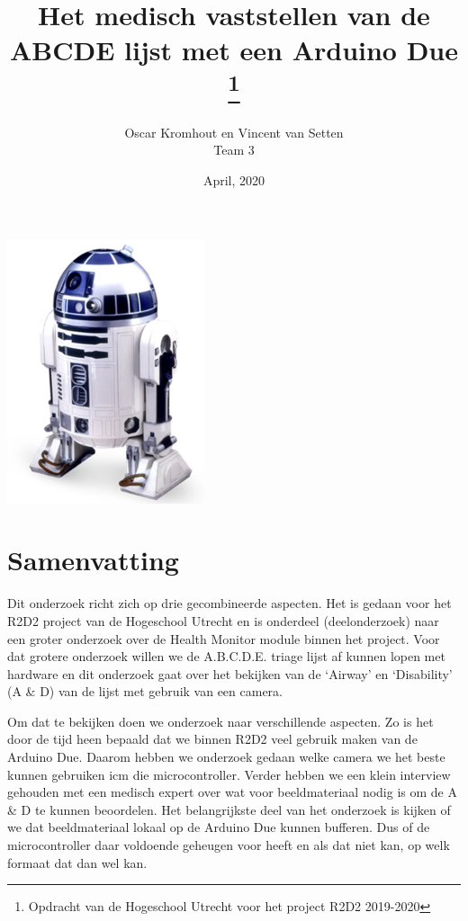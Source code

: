 \documentclass{article}
\title{Het medisch vaststellen van de ABCDE lijst met een Arduino Due \thanks{Opdracht van de Hogeschool Utrecht voor het project R2D2 2019-2020}}
\author{Oscar Kromhout en Vincent van Setten\\ Team 3}
\date{April, 2020}
\begin{document}
\begin{titlepage}
	\centering
	\maketitle
	\includegraphics[scale=2.0]{title.png}
	\clearpage
\end{titlepage}

\tableofcontents
\clearpage
\section{Samenvatting}
Dit onderzoek richt zich op drie gecombineerde aspecten. Het is gedaan voor het R2D2 project van de Hogeschool Utrecht en is onderdeel (deelonderzoek) naar een groter onderzoek over de Health Monitor module binnen het project. Voor dat grotere onderzoek willen we de A.B.C.D.E. triage lijst af kunnen lopen met hardware en dit onderzoek gaat over het bekijken van de ‘Airway’ en ‘Disability’ (A \& D) van de lijst met gebruik van een camera. 

Om dat te bekijken doen we onderzoek naar verschillende aspecten. Zo is het door de tijd heen bepaald dat we binnen R2D2 veel gebruik maken van de Arduino Due. Daarom hebben we onderzoek gedaan welke camera we het beste kunnen gebruiken icm die microcontroller. Verder hebben we een klein interview gehouden met een medisch expert over wat voor beeldmateriaal nodig is om de A \& D te kunnen beoordelen. Het belangrijkste deel van het onderzoek is kijken of we dat beeldmateriaal lokaal op de Arduino Due kunnen bufferen. Dus of de microcontroller daar voldoende geheugen voor heeft en als dat niet kan, op welk formaat dat dan wel kan. 
\end{document}
